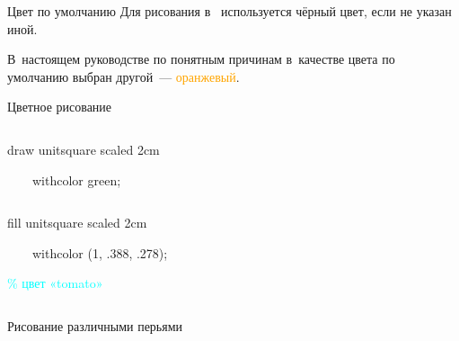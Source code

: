 
\begin{frame}{Цвет по умолчанию}
\large
Для рисования в~ используется
\colorbox{fg}{\textcolor{bg}{чёрный}} цвет, если не указан иной.

В~настоящем руководстве по понятным причинам в~качестве цвета по умолчанию
выбран другой~— \textcolor{orange}{оранжевый}.
\end{frame}


\begin{frame}{Цветное рисование}
\begin{columns}
\centerline{}%
\begin{programlisting}
draw unitsquare scaled 2cm\par
~~~~\alert{withcolor green};
\end{programlisting}
\end{columns}
\bigskip
\begin{columns}
\centerline{}%
\begin{programlisting}
fill unitsquare scaled 2cm\par
~~~~\alert{withcolor (1, .388, .278)};\par
\textcolor{cyan}{\% цвет «tomato»}
\end{programlisting}
\end{columns}
\end{frame}


\begin{frame}{Рисование различными перьями}
\begin{columns}
\centerline{}%
{\LARGE{}}%
\end{columns}
\bigskip
\begin{columns}
\centerline{}%
{\LARGE{}}%
\end{columns}
\bigskip
\begin{columns}
\centerline{}%
{\LARGE{}}%
\end{columns}
\end{frame}

